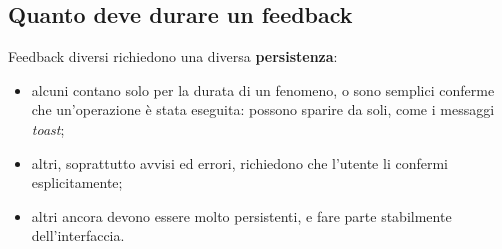 \subsection{Quanto deve durare un feedback}

Feedback diversi richiedono una diversa \textbf{persistenza}:

\begin{itemize}
  \item alcuni contano solo per la durata di un fenomeno, o sono semplici conferme che un'operazione è stata eseguita:
        possono sparire da soli, come i messaggi \textit{toast};
  \item altri, soprattutto avvisi ed errori, richiedono che l'utente li confermi esplicitamente;
  \item altri ancora devono essere molto persistenti, e fare parte stabilmente dell'interfaccia.
\end{itemize}

